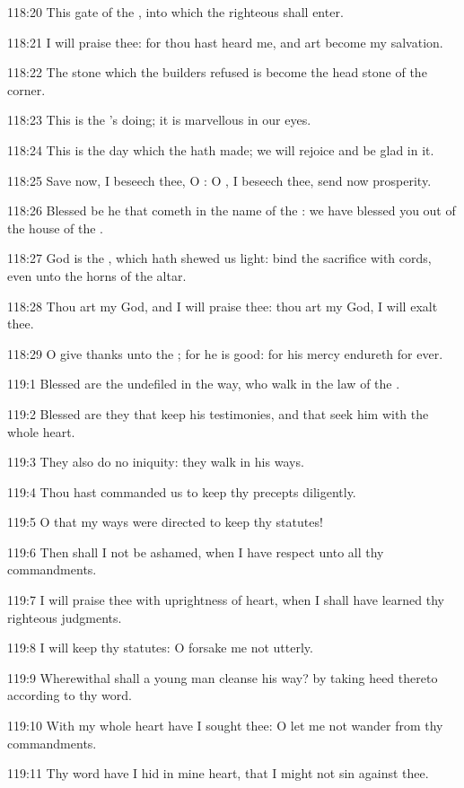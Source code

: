 118:20 This gate of the \LORD, into which the righteous shall enter.

118:21 I will praise thee: for thou hast heard me, and art become my salvation.

118:22 The stone which the builders refused is become the head stone of the corner.

118:23 This is the \LORD's doing; it is marvellous in our eyes.

118:24 This is the day which the \LORD hath made; we will rejoice and be glad in it.

118:25 Save now, I beseech thee, O \LORD: O \LORD, I beseech thee, send now prosperity.

118:26 Blessed be he that cometh in the name of the \LORD: we have blessed you out of the house of the \LORD.

118:27 God is the \LORD, which hath shewed us light: bind the sacrifice with cords, even unto the horns of the altar.

118:28 Thou art my God, and I will praise thee: thou art my God, I will exalt thee.

118:29 O give thanks unto the \LORD; for he is good: for his mercy endureth for ever.



119:1 Blessed are the undefiled in the way, who walk in the law of the \LORD.

119:2 Blessed are they that keep his testimonies, and that seek him with the whole heart.

119:3 They also do no iniquity: they walk in his ways.

119:4 Thou hast commanded us to keep thy precepts diligently.

119:5 O that my ways were directed to keep thy statutes!

119:6 Then shall I not be ashamed, when I have respect unto all thy commandments.

119:7 I will praise thee with uprightness of heart, when I shall have learned thy righteous judgments.

119:8 I will keep thy statutes: O forsake me not utterly.

119:9 Wherewithal shall a young man cleanse his way? by taking heed thereto according to thy word.

119:10 With my whole heart have I sought thee: O let me not wander from thy commandments.

119:11 Thy word have I hid in mine heart, that I might not sin against thee.

